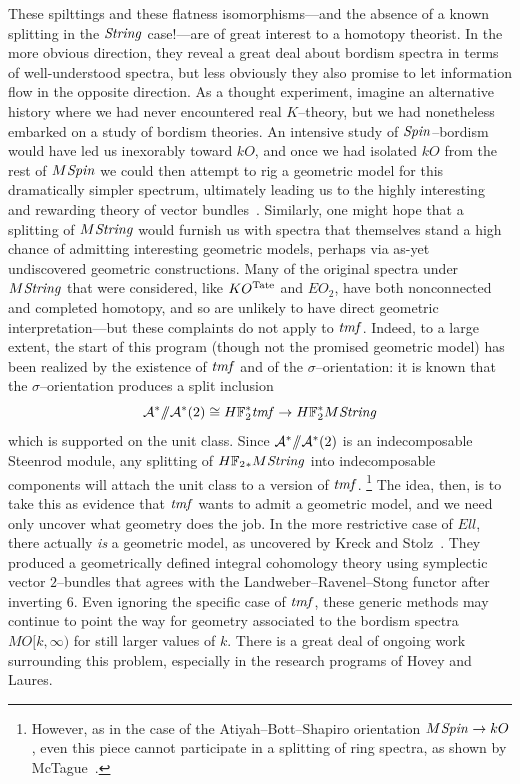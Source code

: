 These spilttings and these flatness isomorphisms---and the absence of a known splitting in the \(\mathit{String}\) case!---are of great interest to a homotopy theorist.
In the more obvious direction, they reveal a great deal about bordism spectra in terms of well-understood spectra, but less obviously they also promise to let information flow in the opposite direction.
As a thought experiment, imagine an alternative history where we had never encountered real \(K\)--theory, but we had nonetheless embarked on a study of bordism theories.
An intensive study of \(\mathit{Spin}\)--bordism would have led us inexorably toward \(kO\), and once we had isolated \(kO\) from the rest of \(M\mathit{Spin}\) we could then attempt to rig a geometric model for this dramatically simpler spectrum, ultimately leading us to the highly interesting and rewarding theory of vector bundles~\cite[pg.\ 338]{HoveyVnEltsOfRings}.
Similarly, one might hope that a splitting of \(M\mathit{String}\) would furnish us with spectra that themselves stand a high chance of admitting interesting geometric models, perhaps via as-yet undiscovered geometric constructions.
Many of the original spectra under \(M\mathit{String}\) that were considered, like \(KO^{\mathrm{Tate}}\) and \(EO_2\), have both nonconnected and completed homotopy, and so are unlikely to have direct geometric interpretation---but these complaints do not apply to \(\mathit{tmf}\).
Indeed, to a large extent, the start of this program (though not the promised geometric model) has been realized by the existence of \(\mathit{tmf}\) and of the \(\sigma\)--orientation: it is known that the \(\sigma\)--orientation produces a split inclusion \[\mathcal A^* \mmod \mathcal A^*(2) \cong \HFtwo^* \tmf \to \HFtwo^* M\String\] which is supported on the unit class.
Since \(\mathcal A^* /\!\!/ \mathcal A^*(2)\) is an indecomposable Steenrod module, any splitting of \(\HFtwo_* M\String\) into indecomposable components will attach the unit class to a version of \(\mathit{tmf}\).%
\footnote{%
However, as in the case of the Atiyah--Bott--Shapiro orientation \(M\mathit{Spin} \to kO\), even this piece cannot participate in a splitting of ring spectra, as shown by McTague~\cite{McTague}.
}
The idea, then, is to take this as evidence that \(\mathit{tmf}\) wants to admit a geometric model, and we need only uncover what geometry does the job.
In the more restrictive case of \(\mathit{Ell}\), there actually \emph{is} a geometric model, as uncovered by Kreck and Stolz~\cite{KreckStolz}.
They produced a geometrically defined integral cohomology theory using symplectic vector \(2\)--bundles that agrees with the Landweber--Ravenel--Stong functor after inverting \(6\).
Even ignoring the specific case of \(\mathit{tmf}\), these generic methods may continue to point the way for geometry associated to the bordism spectra \(MO[k, \infty)\) for still larger values of \(k\).
There is a great deal of ongoing work surrounding this problem, especially in the research programs of Hovey and Laures.


